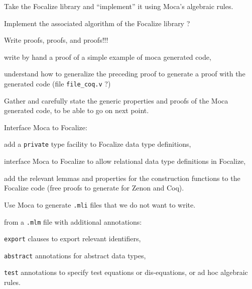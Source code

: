 
\begin{citemize}
 \item Take the Focalize library and ``implement'' it using Moca's algebraic
    rules.
 \item Implement the associated algorithm of the Focalize library ?
\end{citemize}


Write proofs, proofs, and proofs!!!

\begin{citemize}
 \item write by hand a proof of a simple example of moca generated code,
 \item understand how to generalize the preceding proof to generate a proof
 with the generated code (file {\tt file\_coq.v} ?)
\end{citemize}

Gather and carefully state the generic properties and proofs of the Moca
generated code, to be able to go on next point.


Interface Moca to Focalize:

\begin{citemize}
 \item add a {\tt private} type facility to Focalize data type definitions,
 \item interface Moca to Focalize to allow relational data type definitions
 in Focalize,
 \item add the relevant lemmas and properties for the construction functions
 to the Focalize code (free proofs to generate for Zenon and Coq).
\end{citemize}


Use Moca to generate {\tt .mli} files that we do not want to write.

\begin{citemize}
  \item from a {\tt .mlm} file with additional annotations:
     \begin{citemize}
        \item {\tt export} clauses to export relevant identifiers,
        \item {\tt abstract} annotations for abstract data types,
        \item {\tt test} annotations to specify test equations or
        dis-equations, or ad hoc algebraic rules.
     \end{citemize}
\end{citemize}

